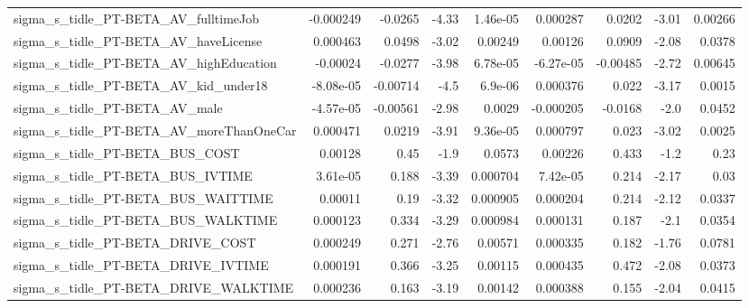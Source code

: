 \begin{tabular}{lrrrrrrrr}
sigma\_s\_tidle\_PT-BETA\_AV\_fulltimeJob               &   -0.000249 &      -0.0265 &     -4.33 & 1.46e-05 &   0.000287 &      0.0202 &        -3.01 &       0.00266 \\
sigma\_s\_tidle\_PT-BETA\_AV\_haveLicense               &    0.000463 &       0.0498 &     -3.02 &  0.00249 &    0.00126 &      0.0909 &        -2.08 &        0.0378 \\
sigma\_s\_tidle\_PT-BETA\_AV\_highEducation             &    -0.00024 &      -0.0277 &     -3.98 & 6.78e-05 &  -6.27e-05 &    -0.00485 &        -2.72 &       0.00645 \\
sigma\_s\_tidle\_PT-BETA\_AV\_kid\_under18               &   -8.08e-05 &     -0.00714 &      -4.5 &  6.9e-06 &   0.000376 &       0.022 &        -3.17 &        0.0015 \\
sigma\_s\_tidle\_PT-BETA\_AV\_male                      &   -4.57e-05 &     -0.00561 &     -2.98 &   0.0029 &  -0.000205 &     -0.0168 &         -2.0 &        0.0452 \\
sigma\_s\_tidle\_PT-BETA\_AV\_moreThanOneCar            &    0.000471 &       0.0219 &     -3.91 & 9.36e-05 &   0.000797 &       0.023 &        -3.02 &        0.0025 \\
sigma\_s\_tidle\_PT-BETA\_BUS\_COST                     &     0.00128 &         0.45 &      -1.9 &   0.0573 &    0.00226 &       0.433 &         -1.2 &          0.23 \\
sigma\_s\_tidle\_PT-BETA\_BUS\_IVTIME                   &    3.61e-05 &        0.188 &     -3.39 & 0.000704 &   7.42e-05 &       0.214 &        -2.17 &          0.03 \\
sigma\_s\_tidle\_PT-BETA\_BUS\_WAITTIME                 &     0.00011 &         0.19 &     -3.32 & 0.000905 &   0.000204 &       0.214 &        -2.12 &        0.0337 \\
sigma\_s\_tidle\_PT-BETA\_BUS\_WALKTIME                 &    0.000123 &        0.334 &     -3.29 & 0.000984 &   0.000131 &       0.187 &         -2.1 &        0.0354 \\
sigma\_s\_tidle\_PT-BETA\_DRIVE\_COST                   &    0.000249 &        0.271 &     -2.76 &  0.00571 &   0.000335 &       0.182 &        -1.76 &        0.0781 \\
sigma\_s\_tidle\_PT-BETA\_DRIVE\_IVTIME                 &    0.000191 &        0.366 &     -3.25 &  0.00115 &   0.000435 &       0.472 &        -2.08 &        0.0373 \\
sigma\_s\_tidle\_PT-BETA\_DRIVE\_WALKTIME               &    0.000236 &        0.163 &     -3.19 &  0.00142 &   0.000388 &       0.155 &        -2.04 &        0.0415 \\

\end{tabular}
